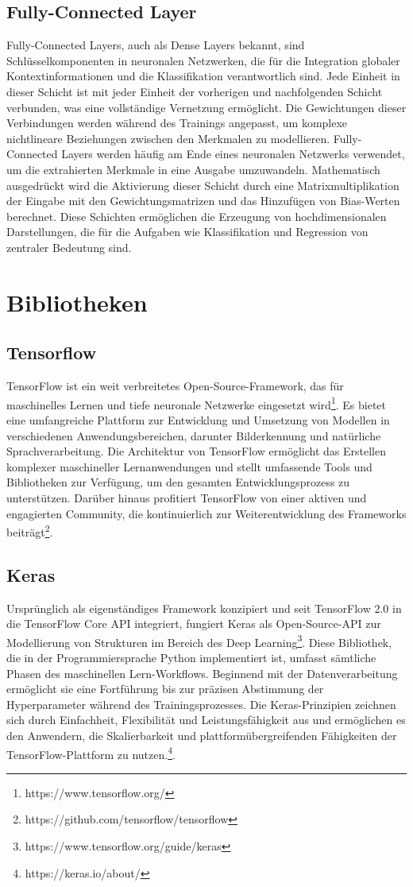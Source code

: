 \subsection{Fully-Connected Layer}
Fully-Connected Layers, auch als Dense Layers bekannt, sind Schlüsselkomponenten in neuronalen Netzwerken, die für die Integration globaler Kontextinformationen und die Klassifikation verantwortlich sind. Jede Einheit in dieser Schicht ist mit jeder Einheit der vorherigen und nachfolgenden Schicht verbunden, was eine vollständige Vernetzung ermöglicht. Die Gewichtungen dieser Verbindungen werden während des Trainings angepasst, um komplexe nichtlineare Beziehungen zwischen den Merkmalen zu modellieren. Fully-Connected Layers werden häufig am Ende eines neuronalen Netzwerks verwendet, um die extrahierten Merkmale in eine Ausgabe umzuwandeln. Mathematisch ausgedrückt wird die Aktivierung dieser Schicht durch eine Matrixmultiplikation der Eingabe mit den Gewichtungsmatrizen und das Hinzufügen von Bias-Werten berechnet. Diese Schichten ermöglichen die Erzeugung von hochdimensionalen Darstellungen, die für die Aufgaben wie Klassifikation und Regression von zentraler Bedeutung sind.

\section{Bibliotheken}
\subsection{Tensorflow}
TensorFlow ist ein weit verbreitetes Open-Source-Framework, das für maschinelles Lernen und tiefe neuronale Netzwerke eingesetzt wird\footnote{https://www.tensorflow.org/}. Es bietet eine umfangreiche Plattform zur Entwicklung und Umsetzung von Modellen in verschiedenen Anwendungsbereichen, darunter Bilderkennung und natürliche Sprachverarbeitung. Die Architektur von TensorFlow ermöglicht das Erstellen komplexer maschineller Lernanwendungen und stellt umfassende Tools und Bibliotheken zur Verfügung, um den gesamten Entwicklungsprozess zu unterstützen. Darüber hinaus profitiert TensorFlow von einer aktiven und engagierten Community, die kontinuierlich zur Weiterentwicklung des Frameworks beiträgt\footnote{https://github.com/tensorflow/tensorflow}.

\subsection{Keras}
Ursprünglich als eigenständiges Framework konzipiert und seit TensorFlow 2.0 in die TensorFlow Core API integriert, fungiert Keras als Open-Source-API zur Modellierung von Strukturen im Bereich des Deep Learning\footnote{https://www.tensorflow.org/guide/keras}. Diese Bibliothek, die in der Programmiersprache Python implementiert ist, umfasst sämtliche Phasen des maschinellen Lern-Workflows. Beginnend mit der Datenverarbeitung ermöglicht sie eine Fortführung bis zur präzisen Abstimmung der Hyperparameter während des Trainingsprozesses. Die Keras-Prinzipien zeichnen sich durch Einfachheit, Flexibilität und Leistungsfähigkeit aus und ermöglichen es den Anwendern, die Skalierbarkeit und plattformübergreifenden Fähigkeiten der TensorFlow-Plattform zu nutzen.\footnote{https://keras.io/about/}.